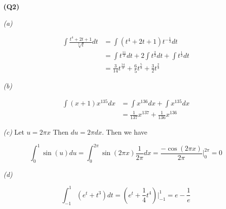 \documentclass[12pt, a4paper]{article}
\begin{document}
\textbf{(Q2)}

\textit{(a)}

\begin{align*}
    \int \frac{t^4 + 2t + 1}{\sqrt[3]{t}} dt & =
    \int (t^4 + 2t + 1)t^{-\frac{1}{3}} dt\\ & =
    \int t^{\frac{11}{3}} dt + 2\int t^{\frac{2}{3}} dt
    + \int t^{\frac{1}{3}} dt \\ & =
    \frac{3}{14}t^{\frac{14}{3}} + \frac{6}{5}t^{\frac{5}{3}}
    + \frac{3}{2}t^{\frac{2}{3}}
\end{align*}

\textit{(b)}

\begin{align*}
    \int (x + 1)x^{135} dx & = \int x^{136} dx + \int x^{135} dx\\
    & = \frac{1}{137}x^{137} + \frac{1}{136}x^{136}
\end{align*}

\textit{(c)} Let $u = 2 \pi x$ Then $du = 2 \pi dx$. Then we have

\[
    \int_0^1 \sin(u) du = \int_{0}^{2 \pi} \sin(2 \pi x)
    \frac{1}{2\pi} dx = \frac{-\cos(2 \pi x)}{2 \pi}
    \big\vert_0^{2 \pi} = 0
\]

\textit{(d)}

\[
    \int_{-1}^{1} (e^t + t^3) dt = (e^t + \frac{1}{4}t^4)\big\vert^1_{-1}
    = e - \frac{1}{e}
\]
\end{document}
